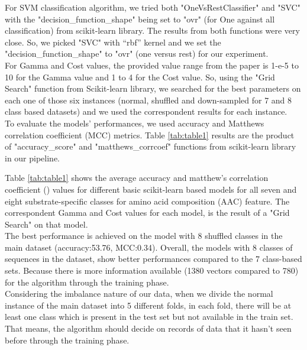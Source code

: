     For SVM classification algorithm, we tried both "OneVsRestClassifier" and "SVC" with the "decision\_function\_shape" 
    being set to "ovr" (for One against all classification) from scikit-learn library. The results from both functions 
    were very close. So, we picked "SVC" with “rbf” kernel and we set the "decision\_function\_shape" to "ovr" (one versus rest) 
    for our experiment.\\

    For Gamma and Cost values, the provided value range from the paper is 1-e-5 to 10 for the Gamma value and 1 to 4 for 
    the Cost value. So, using the "Grid Search" function from Scikit-learn library, we searched for the best parameters 
    on each one of those six instances (normal, shuffled and down-sampled for 7 and 8 class based datasets) and we 
    used the correspondent results for each instance.\\
  

    To evaluate the models' performances, we used accuracy and Matthews correlation coefficient (MCC) metrics.
    Table \ref{tab:table1} results are the product of "accuracy\_score" and "matthews\_corrcoef" functions from scikit-learn 
    library in our pipeline.\\

        
    Table \ref{tab:table1} shows the average accuracy and matthew's correlation coefficient () values for different 
    basic scikit-learn based models for all seven and eight substrate-specific classes for amino acid composition (AAC) feature. 
    The correspondent Gamma and Cost values for each model, is the result of a "Grid Search" on that model.\\

    The best performance is achieved on the model with 8 shuffled classes in the main dataset (accuracy:53.76, MCC:0.34). 
    Overall, the models with 8 classes of sequences in the dataset, show better performances compared to the 7 class-based sets. 
    Because there is more information available (1380 vectors compared to 780) for the algorithm through the training phase.\\

    Considering the imbalance nature of our data, when we divide the normal instance of the main dataset into 5 different folds, 
    in each fold, there will be at least one class which is present in the test set but not available in the train set. That means, 
    the algorithm should decide on records of data that it hasn’t seen before through the training phase.\\

